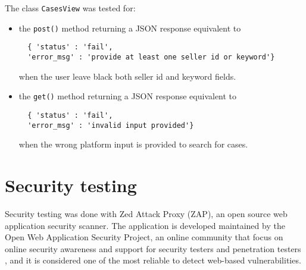 The class \texttt{CasesView} was tested for:
\begin{itemize}
  \item the \texttt{post()} method returning a JSON response equivalent to
  \begin{verbatim}
  { 'status' : 'fail',
  'error_msg' : 'provide at least one seller id or keyword'} \end{verbatim} when
  the user leave black both seller id and keyword fields.
  \item the \texttt{get()} method returning a JSON response equivalent to
  \begin{verbatim}
  { 'status' : 'fail',
  'error_msg' : 'invalid input provided'} \end{verbatim} when the wrong platform
  input is provided to search for cases.
\end{itemize}


\section{Security testing}
Security testing was done with Zed Attack Proxy (ZAP), an open source web
application security scanner. The application is developed maintained by the
Open Web Application Security Project, an online community that focus on online
security awareness and support for security testers and penetration testers
\cite{zap}, and it is considered one of the most reliable to detect
web-based vulnerabilities.

